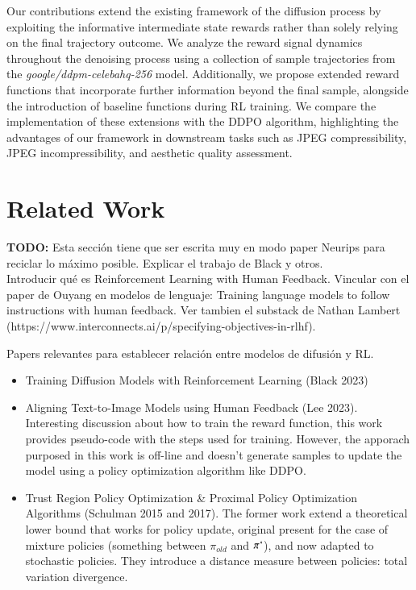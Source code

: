 Our contributions extend the existing framework of the diffusion process by exploiting the informative intermediate state rewards rather than solely relying on the final trajectory outcome. We analyze the reward signal dynamics throughout the denoising process using a collection of sample trajectories from the \textit{google/ddpm-celebahq-256} model. Additionally, we propose extended reward functions that incorporate further information beyond the final sample, alongside the introduction of baseline functions during RL training. We compare the implementation of these extensions with the DDPO algorithm, highlighting the advantages of our framework in downstream tasks such as JPEG compressibility, JPEG incompressibility, and aesthetic quality assessment.

\section{Related Work}

\textbf{TODO:} Esta sección tiene que ser escrita muy en modo paper Neurips
para reciclar lo máximo posible. Explicar el trabajo de Black y otros. \\


Introducir qué es Reinforcement Learning with Human Feedback. Vincular con el paper de Ouyang en modelos de lenguaje: Training language models to follow instructions with human feedback. Ver tambien el substack de Nathan Lambert (https://www.interconnects.ai/p/specifying-objectives-in-rlhf). 

Papers relevantes para establecer relación entre modelos de difusión y RL.

\begin{itemize}
    \item Training Diffusion Models with Reinforcement Learning (Black 2023)
    \item Aligning Text-to-Image Models using Human Feedback (Lee 2023). Interesting discussion about how to train the reward function, this work provides pseudo-code with the steps used for training. However, the apporach purposed in this work is off-line and doesn't generate samples to update the model using a policy optimization algorithm like DDPO.
    \item Trust Region Policy Optimization \& Proximal Policy Optimization Algorithms (Schulman 2015 and 2017). The former work extend a theoretical lower bound that works for policy update, original present for the case of mixture policies (something between $\pi_{old}$ and $\pi`$), and now adapted to stochastic policies. They introduce a distance measure between policies: total variation divergence. 
\end{itemize}

